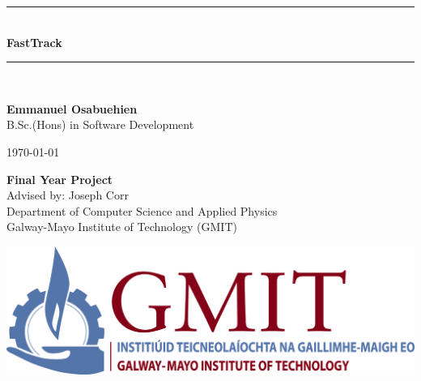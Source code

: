 \documentclass[12pt,a4paper,oneside,openany]{book}
\newcommand{\projecttitle}{FastTrack}
\newcommand{\projectauthor}{Emmanuel Osabuehien \\[0.2cm]}
\newcommand{\projectadvisor}{Joseph Corr \setcounter{page}{2} \\[0.2cm]}
\newcommand{\projectprogramme}{B.Sc.(Hons) in Software Development}
\newcommand{\projectdate}{\today}
\begin{document}
  \begin{titlepage}
    \begin{minipage}[t][6cm]{\textwidth}
      \centering
      \rule{\linewidth}{0.5mm} \\[0.4cm]
      { \LARGE \bfseries \projecttitle \\[0.4cm] }
      \rule{\linewidth}{0.5mm} \\[0.8cm]
    \end{minipage}
    
    \begin{minipage}[t][6.5cm]{\textwidth}
      \centering
      \textbf{\projectauthor}
      \projectprogramme
    \end{minipage}
  
    \begin{minipage}[t][1cm]{\textwidth}
      \centering
      \textsc{\projectdate}
    \end{minipage}
      
    \begin{minipage}[t][3cm]{\textwidth}
      \centering
      \textbf{Final Year Project}\\
      Advised by: \projectadvisor 
      Department of Computer Science and Applied Physics\\
      Galway-Mayo Institute of Technology (GMIT)
    \end{minipage}

    \begin{center}    
          \includegraphics{img/gmit-logo.jpg}
    \end{center}
\end{titlepage}
\setcounter{page}{2}
\tableofcontents



\end{document}
